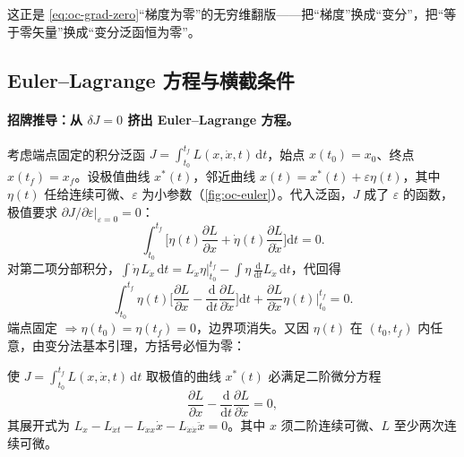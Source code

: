 \noindent 这正是 \cref{eq:oc-grad-zero}“梯度为零”的无穷维翻版——把“梯度”换成“变分”，把“等于零矢量”换成“变分泛函恒为零”。

\subsection{Euler--Lagrange 方程与横截条件}
\label{sec:oc-euler}

\paragraph{招牌推导：从 $\delta J=0$ 挤出 Euler--Lagrange 方程。}
考虑端点固定的积分泛函 $J=\int_{t_0}^{t_f}L(x,\dot x,t)\,\mathrm dt$，始点 $x(t_0)=x_0$、终点 $x(t_f)=x_f$。设极值曲线 $x^*(t)$，邻近曲线 $x(t)=x^*(t)+\varepsilon\eta(t)$，其中 $\eta(t)$ 任给连续可微、$\varepsilon$ 为小参数（\cref{fig:oc-euler}）。代入泛函，$J$ 成了 $\varepsilon$ 的函数，极值要求 $\partial J/\partial\varepsilon|_{\varepsilon=0}=0$：
\begin{equation}
  \int_{t_0}^{t_f}\Big[\eta(t)\frac{\partial L}{\partial x}+\dot\eta(t)\frac{\partial L}{\partial\dot x}\Big]\mathrm dt=0.
  \label{eq:oc-euler-step1}
\end{equation}
对第二项分部积分，$\int\dot\eta\,L_{\dot x}\,\mathrm dt=L_{\dot x}\eta\big|_{t_0}^{t_f}-\int\eta\,\tfrac{\mathrm d}{\mathrm dt}L_{\dot x}\,\mathrm dt$，代回得
\begin{equation}
  \int_{t_0}^{t_f}\eta(t)\Big[\frac{\partial L}{\partial x}-\frac{\mathrm d}{\mathrm dt}\frac{\partial L}{\partial\dot x}\Big]\mathrm dt+\frac{\partial L}{\partial\dot x}\eta(t)\Big|_{t_0}^{t_f}=0.
  \label{eq:oc-euler-step2}
\end{equation}
端点固定 $\Rightarrow\eta(t_0)=\eta(t_f)=0$，边界项消失。又因 $\eta(t)$ 在 $(t_0,t_f)$ 内任意，由变分法基本引理，方括号必恒为零：

\begin{theorem}\label{thm:oc-euler}
使 $J=\int_{t_0}^{t_f}L(x,\dot x,t)\,\mathrm dt$ 取极值的曲线 $x^*(t)$ 必满足二阶微分方程
\begin{equation}
  \boxed{\frac{\partial L}{\partial x}-\frac{\mathrm d}{\mathrm dt}\frac{\partial L}{\partial\dot x}=0,}
  \label{eq:oc-euler}
\end{equation}
其展开式为 $L_x-L_{\dot x t}-L_{\dot x x}\dot x-L_{\dot x\dot x}\ddot x=0$。其中 $x$ 须二阶连续可微、$L$ 至少两次连续可微。
\end{theorem}

